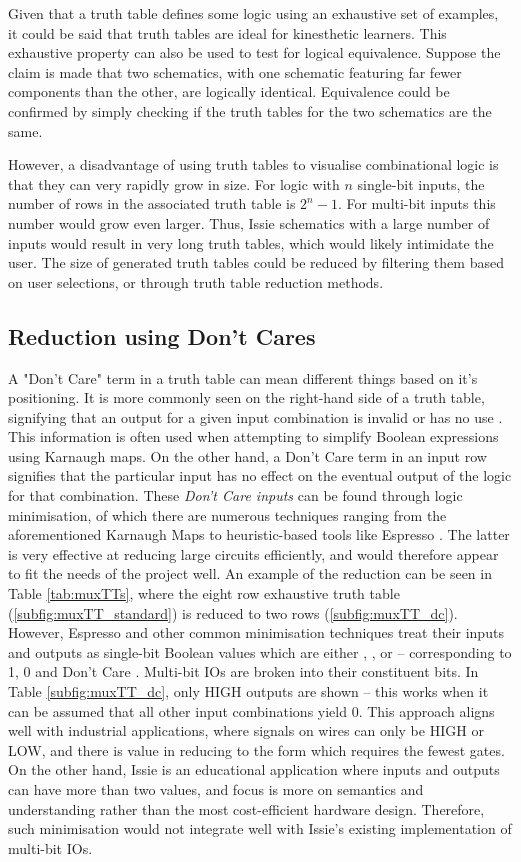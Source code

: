 Given that a truth table defines some logic using an exhaustive set of examples, it could be said that truth tables are ideal for kinesthetic learners. This exhaustive property can also be used to test for logical equivalence. Suppose the claim is made that two schematics, with one schematic featuring far fewer components than the other, are logically identical. Equivalence could be confirmed by simply checking if the truth tables for the two schematics are the same. 

However, a disadvantage of using truth tables to visualise combinational logic is that they can very rapidly grow in size. For logic with $n$ single-bit inputs, the number of rows in the associated truth table is $2^n -1$. For multi-bit inputs this number would grow even larger. Thus, Issie schematics with a large number of inputs would result in very long truth tables, which would likely intimidate the user. The size of generated truth tables could be reduced by filtering them based on user selections, or through truth table reduction methods.   

\subsection{Reduction using Don't Cares} \label{subsec:dcbackground}
A "Don't Care" term in a truth table can mean different things based on it's positioning. It is more commonly seen on the right-hand side of a truth table, signifying that an output for a given input combination is invalid or has no use \cite{1969logic}. This information is often used when attempting to simplify Boolean expressions using Karnaugh maps. On the other hand, a Don't Care term in an input row signifies that the particular input has no effect on the eventual output of the logic for that combination. These \textit{Don't Care inputs} can be found through logic minimisation, of which there are numerous techniques ranging from the aforementioned Karnaugh Maps \cite{kmapbook} to heuristic-based tools like Espresso \cite{espresso}. The latter is very effective at reducing large circuits efficiently, and would therefore appear to fit the needs of the project well. An example of the reduction can be seen in Table \ref{tab:muxTTs}, where the eight row exhaustive truth table (\ref{subfig:muxTT_standard}) is reduced to two rows (\ref{subfig:muxTT_dc}). However, Espresso and other common minimisation techniques treat their inputs and outputs as single-bit Boolean values which are either , , or  -- corresponding to 1, 0 and Don't Care \cite{espressoinputs}. Multi-bit IOs are broken into their constituent bits. In Table \ref{subfig:muxTT_dc}, only HIGH outputs are shown -- this works when it can be assumed that all other input combinations yield 0. This approach aligns well with industrial applications, where signals on wires can only be HIGH or LOW, and there is value in reducing to the form which requires the fewest gates.  On the other hand, Issie is an educational application where inputs and outputs can have more than two values, and focus is more on semantics and understanding rather than the most cost-efficient hardware design. Therefore, such minimisation would not integrate well with Issie's existing implementation of multi-bit IOs.

